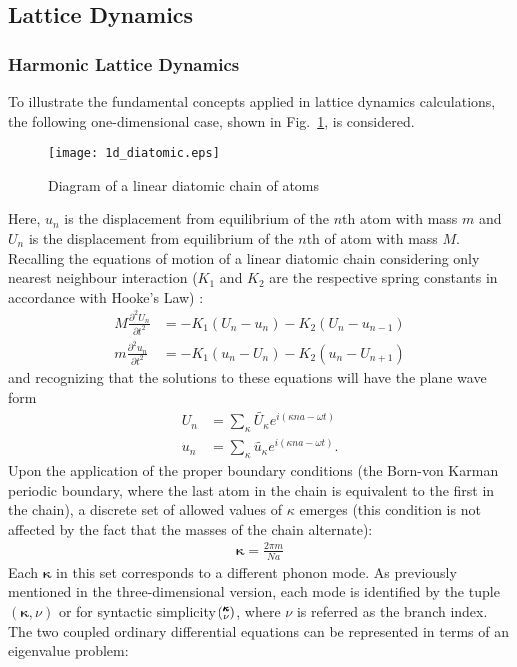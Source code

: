 \subsection{Lattice Dynamics}
\subsubsection{Harmonic Lattice Dynamics}\label{SEC:HLD}
To illustrate the fundamental concepts applied in lattice dynamics calculations, the following one-dimensional case, shown in Fig.~\ref{FIG:diatomic}, is considered. 
\begin{figure}[h!]
\centering
\texttt{[image: 1d\_diatomic.eps]}
\caption{Diagram of a linear diatomic chain of atoms}
\label{FIG:diatomic}
\end{figure}
Here, $u_n$ is the displacement from equilibrium of the $n$th atom with mass $m$ and $U_n$ is the displacement from equilibrium of the $n$th of atom with mass $M$. Recalling the equations of motion of a linear diatomic chain considering only nearest neighbour interaction ($K_1$ and $K_2$ are the respective spring constants in accordance with Hooke's Law) \cite{dove_introduction_1993-3}:
%
\begin{align}
	M\frac{\partial ^2 U_n}{\partial t^2}&=-K_1(U_n-u_n)-K_2(U_n-u_{n-1})\\
	m\frac{\partial ^2 u_n}{\partial t^2}&=-K_1(u_n-U_n)-K_2(u_n-U_{n+1})
\end{align}
%
and recognizing that the solutions to these equations will have the plane wave form
%
\begin{align}
	U_n&=\sum_\kappa \tilde{U_\kappa}e^{i(\kappa na-\omega t)}\\
	u_n&=\sum_\kappa \tilde{u_\kappa}e^{i(\kappa na-\omega t)}.
\end{align}
%
Upon the application of the proper boundary conditions (the Born-von Karman periodic boundary, where the last atom in the chain is equivalent to the first in the chain), a discrete set of allowed values of $\kappa$ emerges (this condition is not affected by the fact that the masses of the chain alternate):
%
\begin{align}
	\pmb{\kappa}=\frac{2\pi m}{Na}
\end{align}
%
Each $\pmb{\kappa}$ in this set corresponds to a different phonon mode. As previously mentioned in the three-dimensional version, each mode is identified by the tuple $(\pmb{\kappa},\nu)$ or for syntactic simplicity $\mspace{-4.0mu}\left(\mspace{-8.0mu} \begin{smallmatrix}&\pmb{\kappa} \\&\nu\end{smallmatrix} \mspace{-3.0mu}\right)$, where $\nu$ is referred as the branch index.  The two coupled ordinary differential equations can be represented in terms of an eigenvalue problem:
